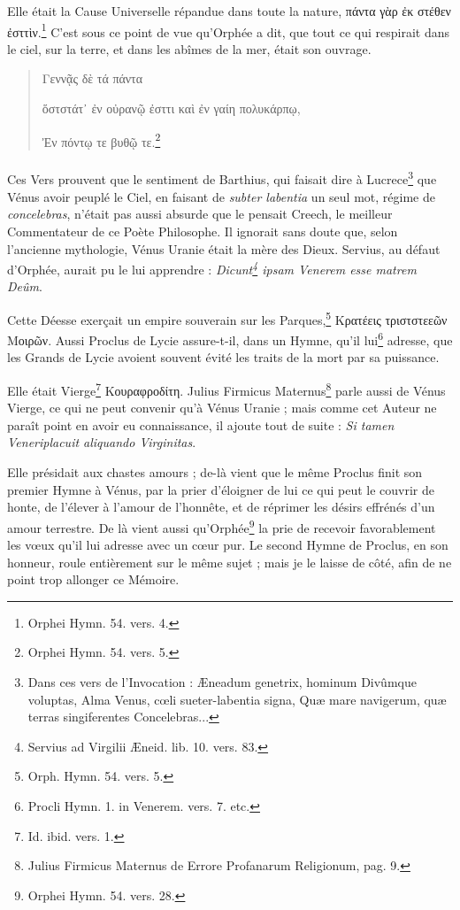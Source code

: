\documentclass[a4paper, 18pt, oneside]{article}
\begin{document}
Elle était la Cause Universelle répandue dans toute la nature, πάντα γὰρ ἐκ στέθεν ἐσττὶν.\footnote{Orphei Hymn. 54. vers. 4.} C'est sous ce point de vue qu'Orphée a dit, que tout ce qui respirait dans le ciel, sur la terre, et dans les abîmes de la mer, était son ouvrage.
\begin{quotation} 
\hspace*{15mm}Γεννᾷς δὲ τά πάντα

ὅστστάτ᾽ ἐν οὐρανῷ ἐσττι καὶ ἐν γαίη πολυκάρπῳ,

Ἐν πόντῳ τε βυθῷ τε.\footnote{Orphei Hymn. 54. vers. 5.}
\end{quotation}
\paragraph{}
Ces Vers prouvent que le sentiment de Barthius, qui faisait dire à Lucrece\footnote{Dans ces vers de l'Invocation : Æneadum genetrix, hominum Divûmque voluptas, Alma Venus, cœli sueter-labentia signa, Quæ mare navigerum, quæ terras singiferentes Concelebras...} que Vénus avoir peuplé le Ciel, en faisant de \emph{subter labentia} un seul mot, régime de \emph{concelebras}, n'était pas aussi absurde que le pensait Creech, le meilleur Commentateur de ce Poète Philosophe. Il ignorait sans doute que, selon l'ancienne mythologie, Vénus Uranie était la mère des Dieux. Servius, au défaut d'Orphée, aurait pu le lui apprendre : \emph{Dicunt\footnote{Servius ad Virgilii Æneid. lib. 10. vers. 83.} ipsam Venerem esse matrem Deûm}.

Cette Déesse exerçait un empire souverain sur les Parques,\footnote{Orph. Hymn. 54. vers. 5.} Κρατέεις τριστστεεῶν Μοιρῶν. Aussi Proclus de Lycie assure-t-il, dans un Hymne, qu'il lui\footnote{Procli Hymn. 1. in Venerem. vers. 7. etc.} adresse, que les Grands de Lycie avoient souvent évité les traits de la mort par sa puissance.

Elle était Vierge\footnote{Id. ibid. vers. 1.} Κουραφροδίτη. Julius Firmicus Maternus\footnote{Julius Firmicus Maternus de Errore Profanarum Religionum, pag. 9.} parle aussi de Vénus Vierge, ce qui ne peut convenir qu'à Vénus Uranie ; mais comme cet Auteur ne paraît point en avoir eu connaissance, il ajoute tout de suite : \emph{Si tamen Veneriplacuit aliquando Virginitas}.

Elle présidait aux chastes amours ; de-là vient que le même Proclus finit son premier Hymne à Vénus, par la prier d'éloigner de lui ce qui peut le couvrir de honte, de l'élever à l'amour de l'honnête, et de réprimer les désirs effrénés d'un amour terrestre. De là vient aussi qu'Orphée\footnote{Orphei Hymn. 54. vers. 28.} la prie de recevoir favorablement les vœux qu'il lui adresse avec un cœur pur. Le second Hymne de Proclus, en son honneur, roule entièrement sur le même sujet ; mais je le laisse de côté, afin de ne point trop allonger ce Mémoire.
\end{document}
